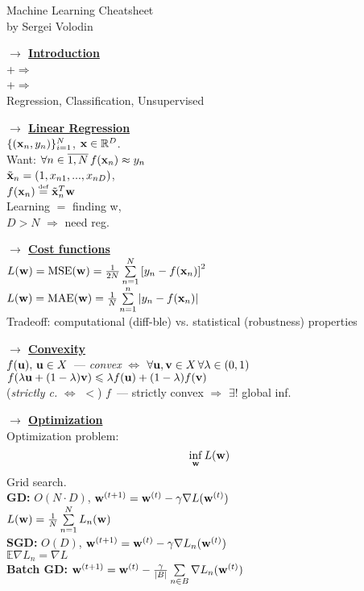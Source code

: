 \documentclass[]{article}
\newcommand{\myvector}[1]{{\bf{#1}}}
\newcommand{\x}{\myvector{x}}
\newcommand{\w}{\myvector{w}}
\newcommand{\uu}{\myvector{u}}
\newcommand{\vv}{\myvector{v}}
\newcommand{\eqdef}{\overset{\mbox{\tiny{def}}}{=}}
\newcommand{\mytitle}[1]{ {\bf $\rightarrow$ \underline{#1}}\\}
\begin{document}
\begin{center}
	{\large Machine Learning Cheatsheet}\\
	by Sergei Volodin
\end{center}
\begin{multicols*}{2}
\mytitle{Introduction}
+$\Rightarrow$\\
+$\Rightarrow$\\
Regression, Classification, Unsupervised

\mytitle{Linear Regression}
$\{(\x_n, y_n)\}_{i=1}^N$, $\x\in \mathbb{R}^D$.\\
Want: $\forall n\in\overline{1, N}\,f(\x_n)\approx y_n$\\
$\tilde{\x}_n=(1,x_{n1},...,x_{nD})$,\\
$f(\x_n)\eqdef \tilde{\x}_n^T\w$\\
Learning $=$ finding w,\\
$D>N$ $\Rightarrow$ need reg.

\mytitle{Cost functions}
$L(\w)=\mbox{MSE}(\w)=\frac{1}{2N}\sum\limits_{n=1}^N\left[y_n-f(\x_n)\right]^2$\\
$L(\w)=\mbox{MAE}(\w)=\frac{1}{N}\sum\limits_{n=1}^n\left|y_n-f(\x_n)\right|$\\

Tradeoff: computational (diff-ble) vs. statistical (robustness) properties

\mytitle{Convexity}
$f(\uu),\,\uu\in X$~--- {\em convex} $\Leftrightarrow$
$\forall \uu, \vv\in X\,\forall \lambda\in \left(0,1\right)$\\
$f(\lambda \uu + (1-\lambda) \vv)\leqslant \lambda f(\uu)+(1-\lambda)f(\vv)$\\
({\em strictly c.} $\Leftrightarrow$ $<$)
$f$~--- strictly convex $\Rightarrow$ $\exists !$ global inf.

\mytitle{Optimization}
Optimization problem:
$$\inf\limits_{\w}L(\w)$$ Grid search.\\
{\bf GD:} $O(N\cdot D)$, $\w^{(t+1)}=\w^{(t)}-\gamma\nabla L(\w^{(t)})$\\
$L(\w)=\frac{1}{N}\sum\limits_{n=1}^N L_n(\w)$\\
{\bf SGD:} $O(D)$, $\w^{(t+1)}=\w^{(t)}-\gamma\nabla L_n(\w^{(t)})$\\
$\mathbb{E}\nabla L_n=\nabla L$\\
{\bf Batch GD:}  $\w^{(t+1)}=\w^{(t)}-\frac{\gamma}{|B|} \sum\limits_{n\in B}\nabla L_n(\w^{(t)})$


\end{multicols*}
\end{document}
